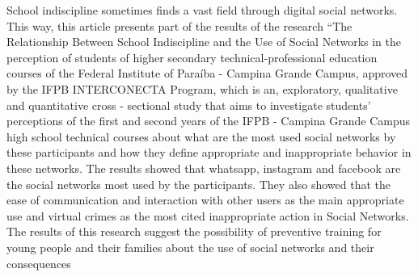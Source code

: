 School indiscipline sometimes finds a vast field through digital social networks. This way, this article presents
part of the results of the research “The Relationship Between School Indiscipline and the Use of Social Networks
in the perception of students of higher secondary technical-professional education courses of the Federal
Institute of Paraíba - Campina Grande Campus, approved by the IFPB INTERCONECTA Program, which is an,
exploratory, qualitative and quantitative cross - sectional study that aims to investigate students’ perceptions
of the first and second years of the IFPB - Campina Grande Campus high school technical courses about what
are the most used social networks by these participants and how they define appropriate and inappropriate
behavior in these networks. The results showed that whatsapp, instagram and facebook are the social networks
most used by the participants. They also showed that the ease of communication and interaction with other
users as the main appropriate use and virtual crimes as the most cited inappropriate action in Social Networks.
The results of this research suggest the possibility of preventive training for young people and their families
about the use of social networks and their consequences


\vspace{0.5cm}%


